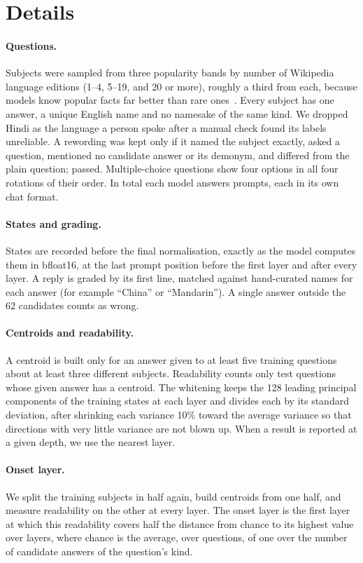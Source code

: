 \section{Details}
\label{app:details}

\paragraph{Questions.} Subjects were sampled from three popularity bands by number of Wikipedia language editions (1--4, 5--19, and 20 or more), roughly a third from each, because models know popular facts far better than rare ones~\citep{mallen2022when}. Every subject has one answer, a unique English name and no namesake of the same kind. We dropped Hindi as the language a person spoke after a manual check found its labels unreliable. A rewording was kept only if it named the subject exactly, asked a question, mentioned no candidate answer or its demonym, and differed from the plain question; \NRewrites{} passed. Multiple-choice questions show four options in all four rotations of their order. In total each model answers \NPromptsAnalysed{} prompts, each in its own chat format.

\paragraph{States and grading.} States are recorded before the final normalisation, exactly as the model computes them in bfloat16, at the last prompt position before the first layer and after every layer. A reply is graded by its first line, matched against hand-curated names for each answer (for example ``China'' or ``Mandarin''). A single answer outside the 62 candidates counts as wrong.

\paragraph{Centroids and readability.} A centroid is built only for an answer given to at least five training questions about at least three different subjects. Readability counts only test questions whose given answer has a centroid. The whitening keeps the 128 leading principal components of the training states at each layer and divides each by its standard deviation, after shrinking each variance 10\% toward the average variance so that directions with very little variance are not blown up. When a result is reported at a given depth, we use the nearest layer.

\paragraph{Onset layer.} We split the training subjects in half again, build centroids from one half, and measure readability on the other at every layer. The onset layer is the first layer at which this readability covers half the distance from chance to its highest value over layers, where chance is the average, over questions, of one over the number of candidate answers of the question's kind.

